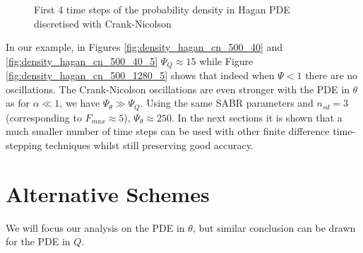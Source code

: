 \documentclass[]{rAMF2e}
\begin{document}
\begin{figure}[htb]
  \begin{center}  
  \end{center}
     \caption{\label{fig:density_hagan_500_40_5} First 4 time steps of the probability density in Hagan PDE discretised with Crank-Nicolson}
\end{figure}

In our example, in Figures \ref{fig:density_hagan_cn_500_40} and \ref{fig:density_hagan_cn_500_40_5} $\Psi_Q \approx 15$ while Figure \ref{fig:density_hagan_cn_500_1280_5} shows that indeed when $\Psi < 1$ there are no oscillations. The Crank-Nicolson oscillations are even stronger with the PDE in $\theta$ as for $\alpha \ll 1$, we have $\Psi_{\theta} \gg \Psi_Q$. Using the same SABR parameters and $n_{sd}=3$ (corresponding to $F_{max} \approx 5$), $\Psi_{\theta} \approx 250$. In the next sections it is shown that a much smaller number of time steps can be used with other finite difference time-stepping techniques whilst still preserving good accuracy.

\section{Alternative Schemes}
We will focus our analysis on the PDE in $\theta$, but similar conclusion can be drawn for the PDE in $Q$.
\end{document}

